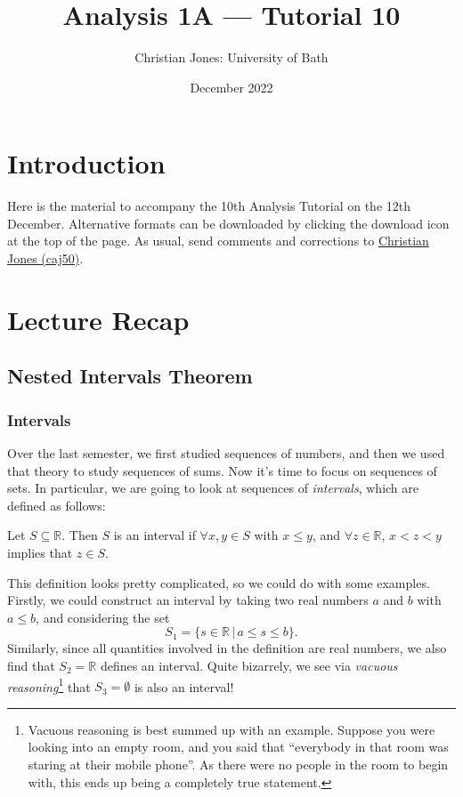 \documentclass[
  12pt,
  a4paper]{extarticle}
\title{Analysis 1A --- Tutorial 10}
\author{Christian Jones: University of Bath}
\date{December 2022}
\theoremstyle{plain}
\theoremstyle{plain}
\theoremstyle{plain}
\theoremstyle{plain}
\theoremstyle{plain}
\theoremstyle{definition}
\theoremstyle{definition}
\theoremstyle{definition}
\theoremstyle{remark}
\let\BeginKnitrBlock\begin \let\EndKnitrBlock\end
\renewcommand{\;}{\,}
\begin{document}
\maketitle

{
\setcounter{tocdepth}{2}
\tableofcontents
}
\newpage
{}

\hypertarget{introduction}{%
\section*{Introduction}\label{introduction}}

Here is the material to accompany the 10th Analysis Tutorial on the 12th December. Alternative formats can be downloaded by clicking the download icon at the top of the page. As usual, send comments and corrections to \href{mailto:caj50@bath.ac.uk}{Christian Jones (caj50)}.

\hypertarget{lecture-recap}{%
\section{Lecture Recap}\label{lecture-recap}}

\hypertarget{nested-intervals-theorem}{%
\subsection{Nested Intervals Theorem}\label{nested-intervals-theorem}}

\hypertarget{intervals}{%
\subsubsection{Intervals}\label{intervals}}

Over the last semester, we first studied sequences of numbers, and then we used that theory to study sequences of sums. Now it's time to focus on sequences of sets. In particular, we are going to look at sequences of \emph{intervals}, which are defined as follows:

\BeginKnitrBlock{definition}[Interval]
{\label{def:def1} }Let \(S \subseteq \mathbb{R}\). Then \(S\) is an interval if \(\forall x,y \in S\) with \(x \leq y\), and \(\forall z \in \mathbb{R}\), \(x < z < y\) implies that \(z \in S\).
\EndKnitrBlock{definition}
This definition looks pretty complicated, so we could do with some examples. Firstly, we could construct an interval by taking two real numbers \(a\) and \(b\) with \(a \leq b\), and considering the set \[S_1 = \lbrace s \in \mathbb{R}\; \lvert\; a \leq s \leq b \rbrace.\] Similarly, since all quantities involved in the definition are real numbers, we also find that \(S_2 = \mathbb{R}\) defines an interval. Quite bizarrely, we see via \emph{vacuous reasoning}\footnote{Vacuous reasoning is best summed up with an example. Suppose you were looking into an empty room, and you said that ``everybody in that room was staring at their mobile phone''. As there were no people in the room to begin with, this ends up being a completely true statement.} that \(S_3 = \emptyset\) is also an interval!
\end{document}
